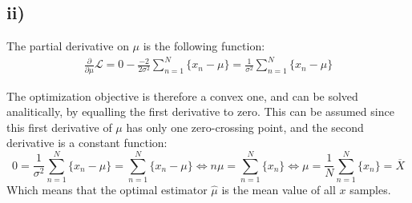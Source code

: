 \documentclass[11pt]{scrartcl} %
\begin{document}
{           %


           \subsection*{ii)}}

           The partial derivative on \(\mu\) is the following function:
           \begin{equation}\label{eq:9}
             \begin{split}
               \frac{\partial}{\partial \mu}\mathcal{L} =  0- \frac{-2}{2\sigma^2}\sum_{n=1}^{N}\{x_n-\mu\} = \frac{1}{\sigma^2}\sum_{n=1}^{N}\{x_n-\mu\} 
               \end{split}
           \end{equation}

           The optimization objective is therefore a convex one, and can be solved analitically, by equalling the first derivative to zero. This can be assumed since this first derivative of \(\mu\) has only one zero-crossing point, and the second derivative is a constant function:
           \begin{equation}
             0 = \frac{1}{\sigma^2}\sum_{n=1}^{N}\{x_n-\mu\} = \sum_{n=1}^{N}\{x_n-\mu\} \iff n\mu = \sum_{n=1}^{N}\{x_n\} \iff \mu = \frac{1}{N}\sum_{n=1}^{N}\{x_n\} = \overline{X}
           \end{equation}
           Which means that the optimal estimator \(\hat\mu\) is the mean value of all \(x\) samples.
\end{document}
